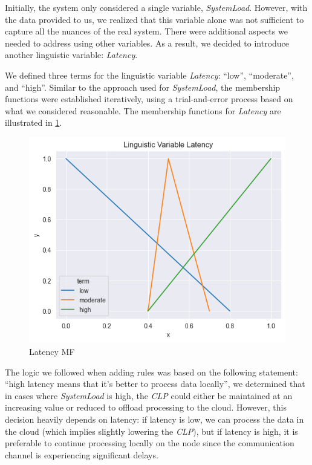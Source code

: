 \documentclass[titlepage]{article}
\begin{document}
\vspace{5mm}


Initially, the system only considered a single variable, \textit{SystemLoad}.
However, with the data provided to us, we realized that this variable alone was not sufficient to capture all the nuances of the real system.
There were additional aspects we needed to address using other variables.
As a result, we decided to introduce another linguistic variable: \textit{Latency}.

We defined three terms for the linguistic variable \textit{Latency}: ``low'', ``moderate'', and ``high''.
Similar to the approach used for \textit{SystemLoad}, the membership functions were established iteratively, using a trial-and-error process based on what we considered reasonable.
The membership functions for \textit{Latency} are illustrated in \cref{fig:latency_triangular_v4}.

\begin{figure}[H]
    \centering
\includegraphics[scale = 0.6]{../images/triangular_v4_latency}
\caption{Latency MF}
\label{fig:latency_triangular_v4}
\end{figure}



The logic we followed when adding rules was based on the following statement: ``high latency means that it’s better to process data locally'', we determined that in cases where \textit{SystemLoad} is high, the \textit{CLP} could either be maintained at an increasing value or reduced to offload processing to the cloud.
However, this decision heavily depends on latency: if latency is low, we can process the data in the cloud (which implies slightly lowering the \textit{CLP}), but if latency is high, it is preferable to continue processing locally on the node since the communication channel is experiencing significant delays.
\end{document}
